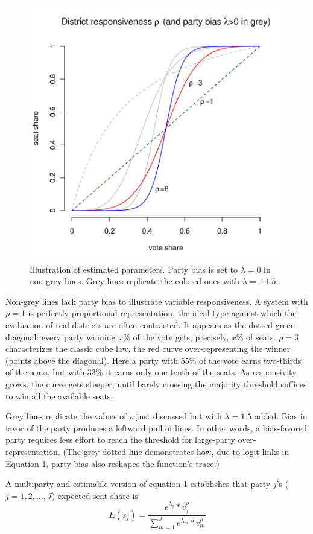 \documentclass[letter,12pt]{article}
\begin{document}
\begin{figure}
\begin{center}
    \includegraphics[width=.55\columnwidth]{rhoExample.pdf} 
\caption{Illustration of estimated parameters. Party bias is set to $\lambda=0$ in non-grey lines. Grey lines replicate the colored ones with $\lambda=+1.5$.}\label{F:lambdaRhoEx}
\end{center}
\end{figure}

Non-grey lines lack party bias to illustrate variable responsiveness. A system with $\rho=1$ is perfectly proportional representation, the ideal type against which the evaluation of real districts are often contrasted. It appears as the dotted green diagonal: every party winning $x$\% of the vote gets, precisely, $x$\% of seats. $\rho=3$ characterizes the classic cube law, the red curve over-representing the winner (points above the diagonal). Here a party with 55\% of the vote earns two-thirds of the seats, but with 33\% it earns only one-tenth of the seats. As responsivity grows, the curve gets steeper, until barely crossing the majority threshold suffices to win all the available seats. 

Grey lines replicate the values of $\rho$ just discussed but with $\lambda = 1.5$ added. Bias in favor of the party produces a leftward pull of lines. In other words, a bias-favored party requires less effort to reach the threshold for large-party over-representation. (The grey dotted line demonstrates how, due to logit links in Equation 1, party bias also reshapes the function's trace.)

A multiparty and estimable version of equation 1 \citep{king.1990elRespBiasMultiparty} establishes that party $j$'s ($j=1,2,\ldots,J$) expected seat share is 
\begin{equation}
 E(s_j) = \frac{e^{\lambda_j} * v_j^\rho}{\sum_{m=1}^{J} e^{\lambda_m} * v_m^\rho}
\end{equation}
\end{document}

